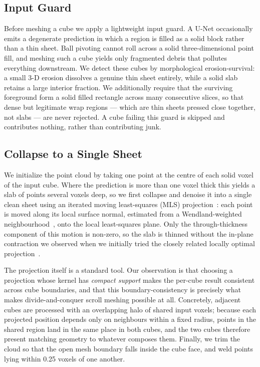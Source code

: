 \subsection{Input Guard}

Before meshing a cube we apply a lightweight input guard. A U-Net occasionally emits a degenerate prediction in which a region is filled as a solid block rather than a thin sheet. Ball pivoting cannot roll across a solid three-dimensional point fill, and meshing such a cube yields only fragmented debris that pollutes everything downstream. We detect these cubes by morphological erosion-survival: a small 3-D erosion dissolves a genuine thin sheet entirely, while a solid slab retains a large interior fraction. We additionally require that the surviving foreground form a solid filled rectangle across many consecutive slices, so that dense but legitimate wrap regions --- which are thin sheets pressed close together, not slabs --- are never rejected. A cube failing this guard is skipped and contributes nothing, rather than contributing junk.

\subsection{Collapse to a Single Sheet}

We initialize the point cloud by taking one point at the centre of each solid voxel of the input cube. Where the prediction is more than one voxel thick this yields a slab of points several voxels deep, so we first collapse and denoise it into a single clean sheet using an iterated moving least-squares (MLS) projection~\cite{levin2003mesh}: each point is moved along its local surface normal, estimated from a Wendland-weighted neighbourhood~\cite{wendland1995piecewise}, onto the local least-squares plane. Only the through-thickness component of this motion is non-zero, so the slab is thinned without the in-plane contraction we observed when we initially tried the closely related locally optimal projection~\cite{lipman2007parameterization}.

The projection itself is a standard tool. Our observation is that choosing a projection whose kernel has \emph{compact support} makes the per-cube result consistent across cube boundaries, and that this boundary-consistency is precisely what makes divide-and-conquer scroll meshing possible at all. Concretely, adjacent cubes are processed with an overlapping halo of shared input voxels; because each projected position depends only on neighbours within a fixed radius, points in the shared region land in the same place in both cubes, and the two cubes therefore present matching geometry to whatever composes them. Finally, we trim the cloud so that the open mesh boundary falls inside the cube face, and weld points lying within 0.25 voxels of one another.

